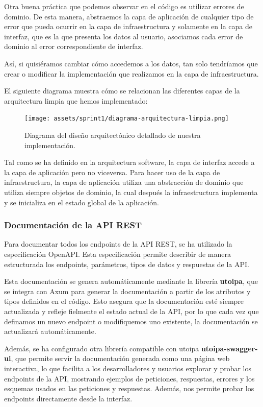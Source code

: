 Otra buena práctica que podemos observar en el código es utilizar errores de dominio. De esta manera, abstraemos la capa de aplicación de cualquier tipo de error que pueda ocurrir en la capa de infraestructura y solamente en la capa de interfaz, que es la que presenta los datos al usuario, asociamos cada error de dominio al error correspondiente de interfaz.

Así, si quisiéramos cambiar cómo accedemos a los datos, tan solo tendríamos que crear o modificar la implementación que realizamos en la capa de infraestructura.

El siguiente diagrama muestra cómo se relacionan las diferentes capas de la arquitectura limpia que hemos implementado:
\begin{figure}[H]
    \begin{center}
        \texttt{[image: assets/sprint1/diagrama-arquitectura-limpia.png]}
    \end{center}
    \caption{Diagrama del diseño arquitectónico detallado de nuestra implementación.}\label{fig:diagrama-arquitectura-limpia-sprint1}
\end{figure}

Tal como se ha definido en la arquitectura software, la capa de interfaz accede a la capa de aplicación pero no viceversa. Para hacer uso de la capa de infraestructura, la capa de aplicación utiliza una abstracción de dominio que utiliza siempre objetos de dominio, la cual después la infraestructura implementa y se inicializa en el estado global de la aplicación.

\subsubsection{Documentación de la API REST}

Para documentar todos los endpoints de la API REST, se ha utilizado la especificación OpenAPI. Esta especificación permite describir de manera estructurada los endpoints, parámetros, tipos de datos y respuestas de la API.

Esta documentación se genera automáticamente mediante la librería \textbf{utoipa}, que se integra con Axum para generar la documentación a partir de los atributos y tipos definidos en el código. 
Esto asegura que la documentación esté siempre actualizada y refleje fielmente el estado actual de la API, por lo que cada vez que definamos un nuevo endpoint o modifiquemos uno existente, la documentación se actualizará automáticamente.

Además, se ha configurado otra librería compatible con utoipa \textbf{utoipa-swagger-ui}, que permite servir la documentación generada como una página web interactiva, lo que facilita a los desarrolladores y usuarios explorar y probar los endpoints de la API, mostrando ejemplos de peticiones, respuestas, errores y los esquemas usados en las peticiones y respuestas.
Además, nos permite probar los endpoints directamente desde la interfaz.

